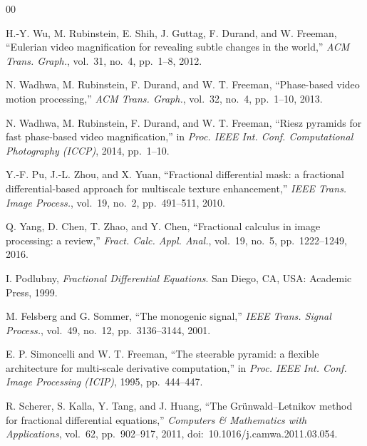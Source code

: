\documentclass[conference]{IEEEtran}
\begin{document}
\begin{thebibliography}{00}

H.-Y. Wu, M. Rubinstein, E. Shih, J. Guttag, F. Durand, and W. Freeman,
``Eulerian video magnification for revealing subtle changes in the world,''
\emph{ACM Trans. Graph.}, vol.~31, no.~4, pp.~1--8, 2012.

N. Wadhwa, M. Rubinstein, F. Durand, and W. T. Freeman,
``Phase-based video motion processing,''
\emph{ACM Trans. Graph.}, vol.~32, no.~4, pp.~1--10, 2013.

N. Wadhwa, M. Rubinstein, F. Durand, and W. T. Freeman,
``Riesz pyramids for fast phase-based video magnification,'' in
\emph{Proc. IEEE Int. Conf. Computational Photography (ICCP)}, 2014, pp.~1--10.

Y.-F. Pu, J.-L. Zhou, and X. Yuan,
``Fractional differential mask: a fractional differential-based approach for
multiscale texture enhancement,''
\emph{IEEE Trans. Image Process.}, vol.~19, no.~2, pp.~491--511, 2010.

Q. Yang, D. Chen, T. Zhao, and Y. Chen,
``Fractional calculus in image processing: a review,''
\emph{Fract. Calc. Appl. Anal.}, vol.~19, no.~5, pp.~1222--1249, 2016.

I. Podlubny, \emph{Fractional Differential Equations}.
San Diego, CA, USA: Academic Press, 1999.

M. Felsberg and G. Sommer,
``The monogenic signal,''
\emph{IEEE Trans. Signal Process.}, vol.~49, no.~12, pp.~3136--3144, 2001.

E. P. Simoncelli and W. T. Freeman,
``The steerable pyramid: a flexible architecture for multi-scale derivative
computation,'' in \emph{Proc. IEEE Int. Conf. Image Processing (ICIP)}, 1995,
pp.~444--447.

R. Scherer, S. Kalla, Y. Tang, and J. Huang,
``The Gr{\"u}nwald--Letnikov method for fractional differential equations,''
\emph{Computers \& Mathematics with Applications}, vol.~62,
pp.~902--917, 2011,
doi:~10.1016/j.camwa.2011.03.054.

\end{thebibliography}
\end{document}
